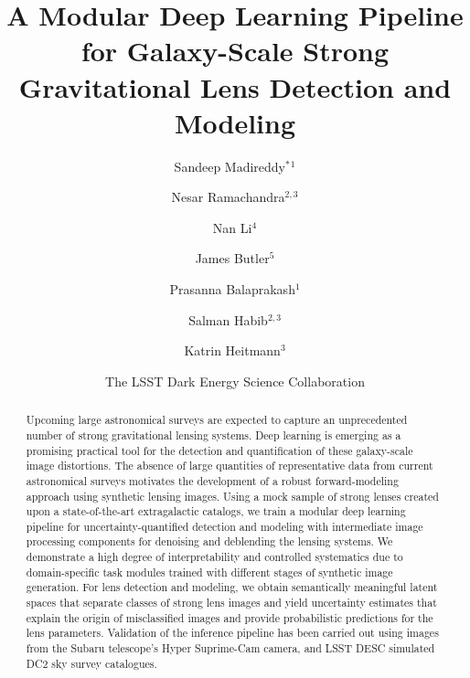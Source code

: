 \documentclass[12pt, twocolumn, apj]{openjournal}
\begin{document}
\title{A Modular Deep Learning Pipeline for Galaxy-Scale Strong Gravitational Lens Detection and Modeling}
\author{Sandeep Madireddy$^*$$^{1}$}
\author{Nesar Ramachandra$^{2,3}$}
\author{Nan Li$^{4}$}
\author{James Butler$^{5}$}
\author{Prasanna Balaprakash$^{1}$}
\author{Salman Habib$^{2,3}$}
\author{Katrin Heitmann$^{3}$}
\author{The LSST Dark Energy Science Collaboration}





\begin{abstract}
Upcoming large astronomical surveys are expected to capture an unprecedented number of strong gravitational lensing systems. Deep learning is emerging as a promising practical tool for the detection and quantification of these galaxy-scale image distortions. The absence of large quantities of representative data from current astronomical surveys motivates the development of a robust forward-modeling approach using synthetic lensing images. 
Using a mock sample of strong lenses created upon a state-of-the-art extragalactic catalogs, we train a modular deep learning pipeline for uncertainty-quantified detection and modeling with intermediate image processing components for denoising and deblending the lensing systems. We demonstrate a high degree of interpretability and controlled systematics due to domain-specific task modules trained with different stages of synthetic image generation. For lens detection and modeling, we obtain semantically meaningful latent spaces that separate classes of strong lens images and yield uncertainty estimates that explain the origin of misclassified images and provide probabilistic predictions for the lens parameters. Validation of the inference pipeline has been carried out using images from the Subaru telescope's Hyper Suprime-Cam camera, and LSST DESC simulated DC2 sky survey catalogues.
\end{abstract}
\end{document}
